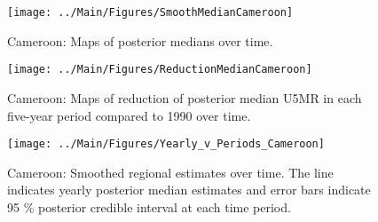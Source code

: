 \documentclass[12pt]{article}\usepackage[]{graphicx}\usepackage[]{color}
\newenvironment{knitrout}{}{} %
\begin{document}
\begin{knitrout}
\color{fgcolor}\begin{figure}[bht]

{\centering \texttt{[image: ../Main/Figures/SmoothMedianCameroon]} 

}

\caption[Cameroon]{Cameroon: Maps of posterior medians over time.}\label{fig:unnamed-chunk-44}
\end{figure}


\end{knitrout}
\begin{knitrout}
\color{fgcolor}\begin{figure}[bht]

{\centering \texttt{[image: ../Main/Figures/ReductionMedianCameroon]} 

}

\caption[Cameroon]{Cameroon: Maps of reduction of posterior median U5MR in each five-year period compared to 1990 over time.}\label{fig:unnamed-chunk-45}
\end{figure}


\end{knitrout}
\begin{knitrout}
\color{fgcolor}\begin{figure}[bht]

{\centering \texttt{[image: ../Main/Figures/Yearly\_v\_Periods\_Cameroon]} 

}

\caption[Cameroon]{Cameroon: Smoothed regional estimates over time. The line indicates yearly posterior median estimates and error bars indicate 95 \% posterior credible interval at each time period.}\label{fig:unnamed-chunk-46}
\end{figure}


\end{knitrout}
\end{document}
